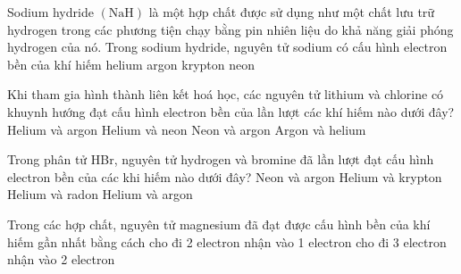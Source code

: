 \begin{ex}
	Sodium hydride $(\mathrm{NaH})$ là một hợp chất được sử dụng như một chất lưu trữ hydrogen trong các phương tiện chạy bằng pin nhiên liệu do khả năng giải phóng hydrogen của nó. Trong sodium hydride, nguyên tử sodium có cấu hình electron bền của khí hiếm
	\choice
	{helium}
	{argon}
	{krypton}
	{\True neon}
\end{ex}
\begin{ex}
	Khi tham gia hình thành liên kết hoá học, các nguyên tử lithium và chlorine có khuynh hướng đạt cấu hình electron bền của lần lượt các khí hiếm nào dưới đây?
	\choice
	{Helium và argon}
	{\True Helium và neon}
	{Neon và argon}
	{Argon và helium}
\end{ex}
\begin{ex}
	Trong phân tử HBr, nguyên tử hydrogen và bromine đã lần lượt đạt cấu hình electron bền của các khi hiếm nào dưới đây?
	\choice
	{Neon và argon}
	{\True Helium và krypton}
	{Helium và radon}
	{Helium và argon}
\end{ex}
\begin{ex}
	Trong các hợp chất, nguyên tử magnesium đã đạt được cấu hình bền của khí hiếm gần nhất bằng cách
	\choice
	{\True cho đi 2 electron}
	{nhận vào 1 electron}
	{cho đi 3 electron}
	{nhận vào 2 electron}
\end{ex}
